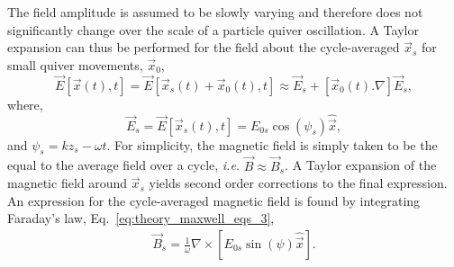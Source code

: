 The field amplitude is assumed to be slowly varying and therefore does not significantly change over the scale of a particle quiver oscillation.
A Taylor expansion can thus be performed for the field about the cycle-averaged $\vec{x}_s$ for small quiver movements, $\vec{x}_0$,
\begin{equation}
    \vec{E}\left[\vec{x}(t),t\right] = \vec{E}\left[\vec{x}_s(t) + \vec{x}_0(t),t\right] \approx \vec{E}_s + \left[ \vec{x}_0(t).\nabla \right] \vec{E}_s,
\end{equation}
where,
\begin{equation}
    \vec{E}_s = \vec{E}\left[ \vec{x}_s(t),t \right] = E_{0s} \cos{(\psi_s)} \hat{\vec{x}},
\end{equation}
and $\psi_s = kz_s - \omega t$.
For simplicity, the magnetic field is simply taken to be the equal to the average field over a cycle, \textit{i.e.} $\vec{B}\approx\vec{B}_s$.
A Taylor expansion of the magnetic field around $\vec{x}_s$ yields second order corrections to the final expression.
An expression for the cycle-averaged magnetic field is found by integrating Faraday's law, Eq.~\ref{eq:theory_maxwell_eqs_3},
\begin{eqnarray}
    \label{eq:theory_ponder_B}
    \vec{B}_s = \frac{1}{\omega}\nabla\times \left[ E_{0s} \sin{(\psi)} \hat{\vec{x}} \right].
\end{eqnarray}

